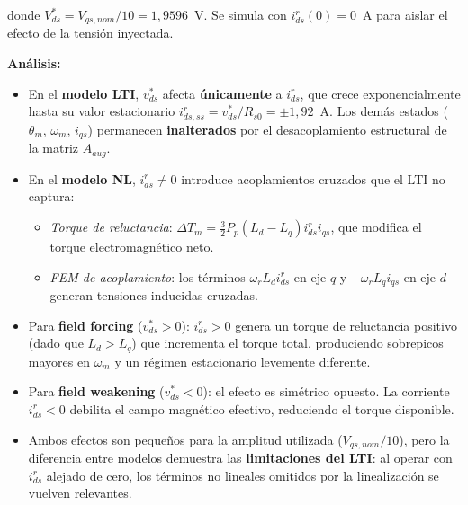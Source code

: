donde $V_{ds}^* = V_{qs,nom}/10 = 1{,}9596$~V. Se simula con $i_{ds}^r(0) = 0$~A para aislar el efecto de la tensión inyectada.


\textbf{Análisis:}
\begin{itemize}
    \item En el \textbf{modelo LTI}, $v_{ds}^*$ afecta \textbf{únicamente} a $i_{ds}^r$, que crece exponencialmente hasta su valor estacionario $i_{ds,ss}^r = v_{ds}^*/R_{s0} = \pm 1{,}92$~A. Los demás estados ($\theta_m$, $\omega_m$, $i_{qs}$) permanecen \textbf{inalterados} por el desacoplamiento estructural de la matriz $A_{aug}$.

    \item En el \textbf{modelo NL}, $i_{ds}^r \neq 0$ introduce acoplamientos cruzados que el LTI no captura:
    \begin{itemize}
        \item \textit{Torque de reluctancia}: $\Delta T_m = \tfrac{3}{2}P_p(L_d - L_q) i_{ds}^r i_{qs}$, que modifica el torque electromagnético neto.
        \item \textit{FEM de acoplamiento}: los términos $\omega_r L_d i_{ds}^r$ en eje $q$ y $-\omega_r L_q i_{qs}$ en eje $d$ generan tensiones inducidas cruzadas.
    \end{itemize}

    \item Para \textbf{field forcing} ($v_{ds}^* > 0$): $i_{ds}^r > 0$ genera un torque de reluctancia positivo (dado que $L_d > L_q$) que incrementa el torque total, produciendo sobrepicos mayores en $\omega_m$ y un régimen estacionario levemente diferente.

    \item Para \textbf{field weakening} ($v_{ds}^* < 0$): el efecto es simétrico opuesto. La corriente $i_{ds}^r < 0$ debilita el campo magnético efectivo, reduciendo el torque disponible.

    \item Ambos efectos son pequeños para la amplitud utilizada ($V_{qs,nom}/10$), pero la diferencia entre modelos demuestra las \textbf{limitaciones del LTI}: al operar con $i_{ds}^r$ alejado de cero, los términos no lineales omitidos por la linealización se vuelven relevantes.
\end{itemize}
